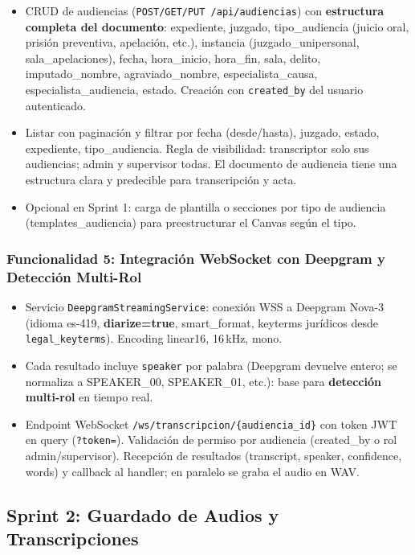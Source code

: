 \documentclass[12pt,a4paper]{report}
\begin{document}
\begin{itemize}
    \item CRUD de audiencias (\texttt{POST/GET/PUT /api/audiencias}) con \textbf{estructura completa del documento}: expediente, juzgado, tipo\_audiencia (juicio oral, prisión preventiva, apelación, etc.), instancia (juzgado\_unipersonal, sala\_apelaciones), fecha, hora\_inicio, hora\_fin, sala, delito, imputado\_nombre, agraviado\_nombre, especialista\_causa, especialista\_audiencia, estado. Creación con \texttt{created\_by} del usuario autenticado.
    \item Listar con paginación y filtrar por fecha (desde/hasta), juzgado, estado, expediente, tipo\_audiencia. Regla de visibilidad: transcriptor solo sus audiencias; admin y supervisor todas. El documento de audiencia tiene una estructura clara y predecible para transcripción y acta.
    \item Opcional en Sprint 1: carga de plantilla o secciones por tipo de audiencia (templates\_audiencia) para preestructurar el Canvas según el tipo.
\end{itemize}

\subsubsection{Funcionalidad 5: Integración WebSocket con Deepgram y Detección Multi-Rol}

\begin{itemize}
    \item Servicio \texttt{DeepgramStreamingService}: conexión WSS a Deepgram Nova-3 (idioma es-419, \textbf{diarize=true}, smart\_format, keyterms jurídicos desde \texttt{legal\_keyterms}). Encoding linear16, 16\,kHz, mono.
    \item Cada resultado incluye \texttt{speaker} por palabra (Deepgram devuelve entero; se normaliza a SPEAKER\_00, SPEAKER\_01, etc.): base para \textbf{detección multi-rol} en tiempo real.
    \item Endpoint WebSocket \texttt{/ws/transcripcion/\{audiencia\_id\}} con token JWT en query (\texttt{?token=}). Validación de permiso por audiencia (created\_by o rol admin/supervisor). Recepción de resultados (transcript, speaker, confidence, words) y callback al handler; en paralelo se graba el audio en WAV.
\end{itemize}

\subsection{Sprint 2: Guardado de Audios y Transcripciones}
\end{document}

